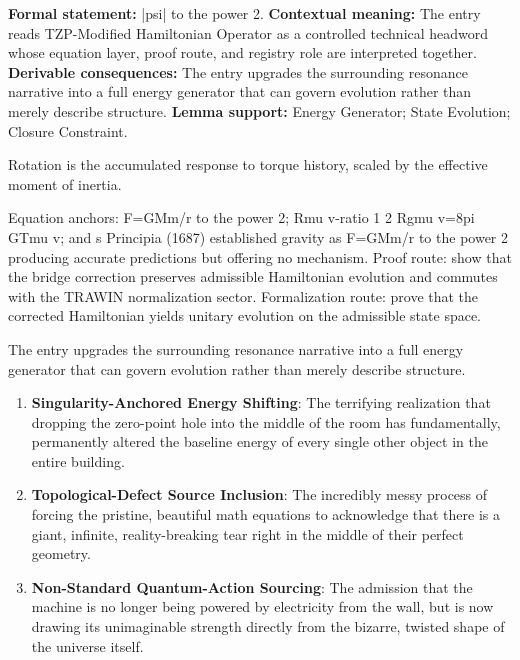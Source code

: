\begingroup\footnotesize\setlength{\emergencystretch}{3em}\sloppy
\textbf{Formal statement:} |psi| to the power 2. \textbf{Contextual meaning:} The entry reads TZP-Modified Hamiltonian Operator as a controlled technical headword whose equation layer, proof route, and registry role are interpreted together. \textbf{Derivable consequences:} The entry upgrades the surrounding resonance narrative into a full energy generator that can govern evolution rather than merely describe structure. \textbf{Lemma support:} Energy Generator; State Evolution; Closure Constraint.\par
\endgroup

Rotation is the accumulated response to torque history, scaled by the effective moment of inertia.

Equation anchors: F=GMm/r to the power 2; Rmu v-ratio 1 2 Rgmu v=8pi GTmu v; and s Principia (1687) established gravity as F=GMm/r to the power 2 producing accurate predictions but offering no mechanism. Proof route: show that the bridge correction preserves admissible Hamiltonian evolution and commutes with the TRAWIN normalization sector. Formalization route: prove that the corrected Hamiltonian yields unitary evolution on the admissible state space.

The entry upgrades the surrounding resonance narrative into a full energy generator that can govern evolution rather than merely describe structure.
\endgroup

\begin{enumerate}[leftmargin=1.6em,itemsep=6pt,topsep=4pt]
\item \textbf{Singularity-Anchored Energy Shifting}: The terrifying realization that dropping the zero-point hole into the middle of the room has fundamentally, permanently altered the baseline energy of every single other object in the entire building.
\item \textbf{Topological-Defect Source Inclusion}: The incredibly messy process of forcing the pristine, beautiful math equations to acknowledge that there is a giant, infinite, reality-breaking tear right in the middle of their perfect geometry.
\item \textbf{Non-Standard Quantum-Action Sourcing}: The admission that the machine is no longer being powered by electricity from the wall, but is now drawing its unimaginable strength directly from the bizarre, twisted shape of the universe itself.
\end{enumerate}

